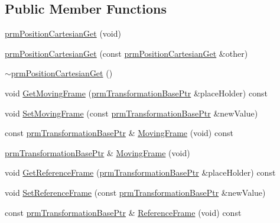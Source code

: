 \subsection*{Public Member Functions}
\begin{DoxyCompactItemize}
\item 
\hyperlink{classprm_position_cartesian_get_ac0941fa7c4cc4583adf6b1cecb7d92f0}{prm\+Position\+Cartesian\+Get} (void)
\item 
\hyperlink{classprm_position_cartesian_get_a7e8b5143b6cbd2883e68856474b5bc54}{prm\+Position\+Cartesian\+Get} (const \hyperlink{classprm_position_cartesian_get}{prm\+Position\+Cartesian\+Get} \&other)
\item 
\hyperlink{classprm_position_cartesian_get_acb3656d5a4781e86d21c857e740d0f75}{$\sim$prm\+Position\+Cartesian\+Get} ()
\item 
void \hyperlink{classprm_position_cartesian_get_a65c1f3544dbdd28ccca698f99561d928}{Get\+Moving\+Frame} (\hyperlink{prm_transformation_base_8h_a881a6a7d2191474974cdf36d79e1df08}{prm\+Transformation\+Base\+Ptr} \&place\+Holder) const 
\item 
void \hyperlink{classprm_position_cartesian_get_aa6f87f3c033e67fcf149388c515e38e3}{Set\+Moving\+Frame} (const \hyperlink{prm_transformation_base_8h_a881a6a7d2191474974cdf36d79e1df08}{prm\+Transformation\+Base\+Ptr} \&new\+Value)
\item 
const \hyperlink{prm_transformation_base_8h_a881a6a7d2191474974cdf36d79e1df08}{prm\+Transformation\+Base\+Ptr} \& \hyperlink{classprm_position_cartesian_get_a7e55c0fe6c7327cd75a5d40e36550297}{Moving\+Frame} (void) const 
\item 
\hyperlink{prm_transformation_base_8h_a881a6a7d2191474974cdf36d79e1df08}{prm\+Transformation\+Base\+Ptr} \& \hyperlink{classprm_position_cartesian_get_a5b5bb24454759a6c00e62f18541a0eec}{Moving\+Frame} (void)
\item 
void \hyperlink{classprm_position_cartesian_get_a367e1e61f0b916e013dab02cc0d578d0}{Get\+Reference\+Frame} (\hyperlink{prm_transformation_base_8h_a881a6a7d2191474974cdf36d79e1df08}{prm\+Transformation\+Base\+Ptr} \&place\+Holder) const 
\item 
void \hyperlink{classprm_position_cartesian_get_aad5362bc55e2018c5cada3f00b07c9aa}{Set\+Reference\+Frame} (const \hyperlink{prm_transformation_base_8h_a881a6a7d2191474974cdf36d79e1df08}{prm\+Transformation\+Base\+Ptr} \&new\+Value)
\item 
const \hyperlink{prm_transformation_base_8h_a881a6a7d2191474974cdf36d79e1df08}{prm\+Transformation\+Base\+Ptr} \& \hyperlink{classprm_position_cartesian_get_af55a562074f9675c2a6aa74a2969420f}{Reference\+Frame} (void) const 

\end{DoxyCompactItemize}
